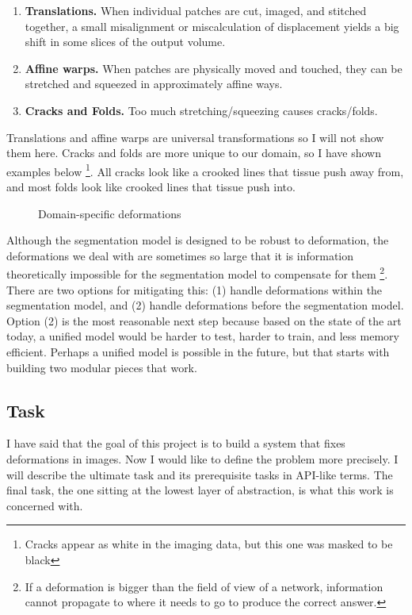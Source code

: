 \documentclass[12pt,a4paper]{article}
\begin{document}
\begin{enumerate} 
  \item {\bf Translations.} When individual patches are cut, imaged, and stitched together, a small misalignment or miscalculation of displacement yields a big shift in some slices of the output volume. 
  \item {\bf Affine warps.} When patches are physically moved and touched, they can be stretched and squeezed in approximately affine ways.
  \item {\bf Cracks and Folds.} Too much stretching/squeezing causes cracks/folds. 
\end{enumerate}

Translations and affine warps are universal transformations so I will not show them here. Cracks and folds are more unique to our domain, so I have shown examples below \footnote{Cracks appear as white in the imaging data, but this one was masked to be black}. All cracks look like a crooked lines that tissue push away from, and most folds look like crooked lines that tissue push into.

\begin{figure}[ht]%
    \centering
	\qquad
    \caption{Domain-specific deformations}%
\end{figure}

Although the segmentation model is designed to be robust to deformation, the deformations we deal with are sometimes so large that it is information theoretically impossible for the segmentation model to compensate for them \footnote{If a deformation is bigger than the field of view of a network, information cannot propagate to where it needs to go to produce the correct answer.}. There are two options for mitigating this: (1) handle deformations within the segmentation model, and (2) handle deformations before the segmentation model. Option (2) is the most reasonable next step because based on the state of the art today, a unified model would be harder to test, harder to train, and less memory efficient. Perhaps a unified model is possible in the future, but that starts with building two modular pieces that work.

\subsection{Task}

I have said that the goal of this project is to build a system that fixes deformations in images. Now I would like to define the problem more precisely. I will describe the ultimate task and its prerequisite tasks in API-like terms. The final task, the one sitting at the lowest layer of abstraction, is what this work is concerned with.
\end{document}
